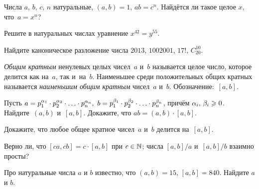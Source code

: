 \documentclass[a4paper,12pt]{article}
\begin{document}
Числа $a$, $b$, $c$, $n$ натуральные, $(a,b) = 1$, $ab = c^n$. Найдётся ли такое целое $x$, что~$a = x^n$?

Решите в натуральных числах уравнение $x^{42} = y^{55}$.

Найдите каноническое разложение числа
$2013$,
$1002001$,
$17!$,
$C_{20}^{10}$.


\emph{Общим кратным} ненулевых целых чисел~$a$ и~$b$ называется целое число, которое делится как на~$a$, так и~на~$b$. Наименьшее среди положительных общих кратных называется \emph{наименьшим общим кратным} чисел~$a$ и~$b$. Обозначение:~$[a,b]$.

Пусть $a=p_1^{\alpha_1}\cdot p_2^{\alpha_2}\cdot\ldots\cdot p_n^{\alpha_n},\,\,b=p_1^{\beta_1}\cdot p_2^{\beta_2}\cdot\ldots\cdot p_n^{\beta_n}$, причём $\alpha_i,\,\beta_i\geqslant0$.\\
Найдите~$(a,b)$ и~$[a,b]$.
Докажите, что $ab=(a,b)\cdot[a,b]$.

Докажите, что любое общее кратное чисел~$a$ и~$b$ делится на~$[a,b]$.

Верно ли, что
$[ca,cb]=c\cdot[a,b]$ при $c\in\mathbb{N}$;
числа $[a,b]/a$ и~$[a,b]/b$ взаимно просты?

Про натуральные числа $a$ и $b$ известно, что $(a,b) = 15$, $[a,b] = 840$. Найдите $a$ и $b$.


\end{document}
